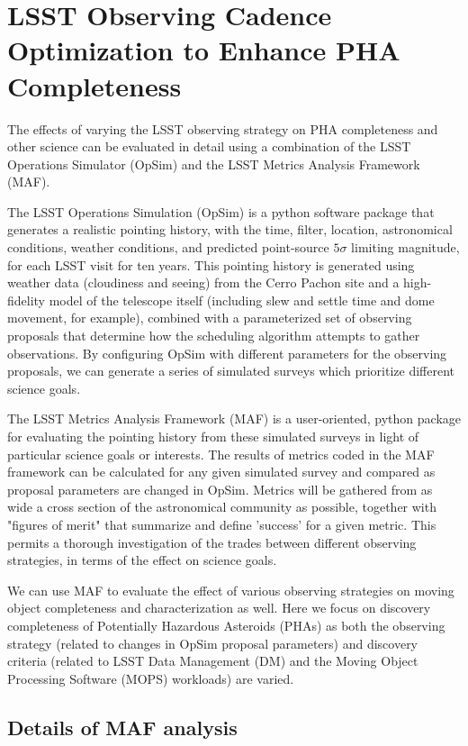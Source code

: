 \section{LSST Observing Cadence Optimization to Enhance PHA Completeness \label{sec:opsim}}

The effects of varying the LSST observing strategy on PHA completeness and other science can be evaluated in detail using a combination of the LSST Operations Simulator (OpSim) and the LSST Metrics Analysis Framework (MAF). 

The LSST Operations Simulation (OpSim) is a python software package that generates a realistic pointing history, with the time, filter, location, astronomical conditions, weather conditions, and predicted point-source $5\sigma$ limiting magnitude, for each LSST visit for ten years. This pointing history is generated using weather data (cloudiness and seeing) from the Cerro Pachon site and a high-fidelity model of the telescope itself (including slew and settle time and dome movement, for example), combined with a parameterized set of observing proposals that determine how the scheduling algorithm attempts to gather observations. By configuring OpSim with different parameters for the observing proposals, we can generate a series of simulated surveys which prioritize different science goals. 

The LSST Metrics Analysis Framework (MAF) is a user-oriented, python package for evaluating the pointing history from these simulated surveys in light of particular science goals or interests. The results of metrics coded in the MAF framework can be calculated for any given simulated survey and compared as proposal parameters are changed in OpSim. Metrics will be gathered from as wide a cross section of the astronomical community as possible, together with "figures of merit" that summarize and define 'success' for a given metric. This permits a thorough investigation of the trades between different observing strategies, in terms of the effect on science goals.

We can use MAF to evaluate the effect of various observing strategies on moving object completeness and characterization as well. Here we focus on discovery completeness of Potentially Hazardous Asteroids (PHAs) as both the observing strategy (related to changes in OpSim proposal parameters) and discovery criteria (related to LSST Data Management (DM) and the Moving Object Processing Software (MOPS) workloads) are varied. 

\subsection{Details of MAF analysis}

